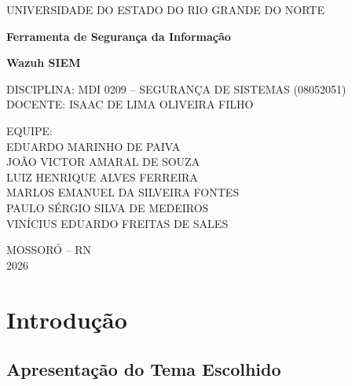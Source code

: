\documentclass[12pt,a4paper]{article}
\begin{document}
    \begin{titlepage}
    \centering

    \vspace*{2cm}

    {\large UNIVERSIDADE DO ESTADO DO RIO GRANDE DO NORTE}

    \vspace{4cm}

    {\Large \textbf{Ferramenta de Segurança da Informação}}

    \vspace{0.5cm}

    {\Large \textbf{Wazuh SIEM}}

    \vspace{3cm}

    {\large
    DISCIPLINA: MDI 0209 -- SEGURANÇA DE SISTEMAS (08052051)\\[0.3cm]
    DOCENTE: ISAAC DE LIMA OLIVEIRA FILHO
    }

    \vspace{2cm}

    {\large EQUIPE:}\\[0.3cm]
    {\large
    EDUARDO MARINHO DE PAIVA\\
    JOÃO VICTOR AMARAL DE SOUZA\\
    LUIZ HENRIQUE ALVES FERREIRA\\
    MARLOS EMANUEL DA SILVEIRA FONTES\\
    PAULO SÉRGIO SILVA DE MEDEIROS\\
    VINÍCIUS EDUARDO FREITAS DE SALES
    }

    \vfill

    {\large MOSSORÓ -- RN\\2026}

    \end{titlepage}

    \newpage

    \tableofcontents
    \newpage

    \section{Introdução}

    \subsection{Apresentação do Tema Escolhido}
\end{document}
